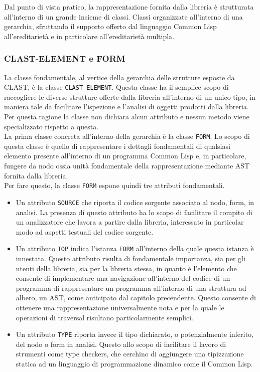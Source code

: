 Dal punto di vista pratico, la rappresentazione fornita dalla libreria è
strutturata all’interno di un grande insieme di classi. Classi organizzate
all’interno di una gerarchia, sfruttando il supporto offerto dal linguaggio
Common Lisp all’ereditarietà e in particolare all’ereditarietà multipla.

\subsubsection{CLAST-ELEMENT e FORM}

La classe fondamentale, al vertice della gerarchia delle strutture esposte da
CLAST, è la classe \texttt{CLAST-ELEMENT}. Questa classe ha il semplice scopo
di raccogliere le diverse strutture offerte dalla libreria all'interno di un
unico tipo, in maniera tale da facilitare l’ispezione e l’analisi di oggetti
prodotti dalla libreria. Per questa ragione la classe non dichiara alcun
attributo e nessun metodo viene specializzato rispetto a questa.\\

La prima classe concreta all’interno della gerarchia è la classe
\texttt{FORM}. Lo scopo di questa classe è quello di rappresentare i dettagli
fondamentali di qualsiasi elemento presente all’interno di un programma Common
Lisp e, in particolare, fungere da nodo ossia unità fondamentale della
rappresentazione mediante AST fornita dalla libreria.\\

Per fare questo, la classe \texttt{FORM} espone quindi tre attributi
fondamentali.

\begin{itemize}

\item Un attributo \texttt{SOURCE} che riporta il codice sorgente associato al
nodo, form, in analisi. La presenza di questo attributo ha lo scopo di
facilitare il compito di un analizzatore che lavora a partire dalla libreria,
interessato in particolar modo ad aspetti testuali del codice sorgente.

\item Un attributo \texttt{TOP} indica l'istanza \texttt{FORM} all’interno
della quale questa istanza è innestata. Questo attributo risulta di
fondamentale importanza, sia per gli utenti della libreria, sia per la
libreria stessa, in quanto è l'elemento che consente di implementare una
navigazione all'interno del codice di un programma di rappresentare un
programma all’interno di una struttura ad albero, un AST, come anticipato dal
capitolo precendente. Questo consente di ottenere una rappresentazione
universalmente nota e per la quale le operazioni di traversal risultano
particolarmente semplici.

\item Un attributo \texttt{TYPE} riporta invece il tipo dichiarato, o
potenzialmente inferito, del nodo o form in analisi. Questo allo scopo di
facilitare il lavoro di strumenti come type checkers, che cerchino di
aggiungere una tipizzazione statica ad un linguaggio di programmazione
dinamico come il Common Lisp.

\end{itemize}

